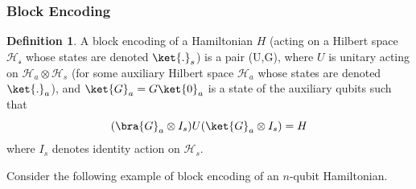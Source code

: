 \documentclass[12pt, oneside]{book}
\theoremstyle{definition}
\newtheorem{definition}{Definition}[section]
\theoremstyle{definition}
\theoremstyle{remark}
\begin{document}
\subsubsection{Block Encoding}
    \begin{definition}
        A block encoding of a Hamiltonian $H$ (acting on a Hilbert space $\mathcal{H_s}$ whose states are denoted $\ket{.}_s$) is a pair (U,G), where $U$ is unitary acting on $\mathcal{H}_a \otimes \mathcal{H}_s$ (for some auxiliary Hilbert space $\mathcal{H}_a$ whose states are denoted $\ket{.}_a$), and $\ket{G}_a=G\ket{0}_a $ is a state of the auxiliary qubits such that
        \[
        (\bra{G}_a \otimes I_s)U(\ket{G}_a\otimes I_s)=H
        \]
        where $I_s$ denotes identity action on $\mathcal{H}_s$.
    \end{definition}
    Consider the following example of block encoding of an $n$-qubit Hamiltonian.
\end{document}
